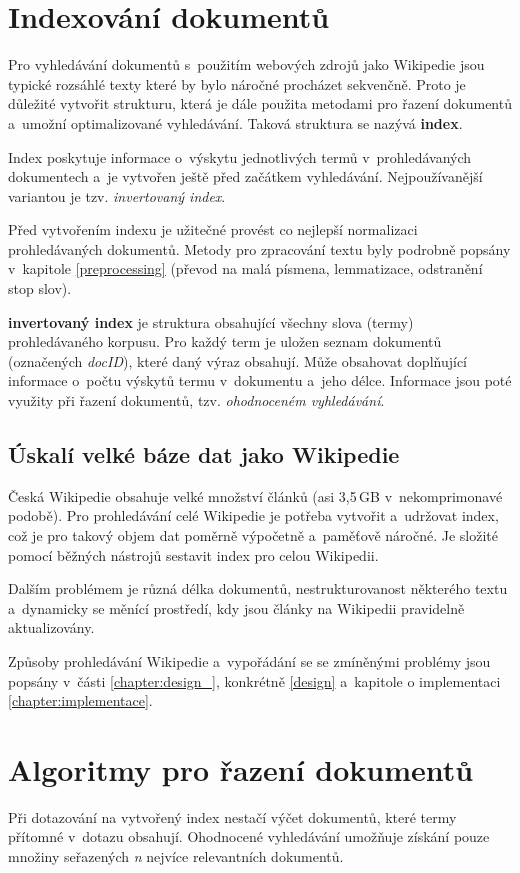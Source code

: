 \section{Indexování dokumentů}
Pro vyhledávání dokumentů s~použitím webových zdrojů jako Wikipedie jsou typické rozsáhlé texty které by bylo náročné procházet sekvenčně. Proto je důležité vytvořit strukturu, která je dále použita metodami pro řazení dokumentů a~umožní optimalizované vyhledávání. Taková struktura se nazývá \textbf{index}.\par
Index poskytuje informace o~výskytu jednotlivých termů v~prohledávaných dokumentech a~je vytvořen ještě před začátkem vyhledávání. Nejpoužívanější variantou je tzv. \emph{invertovaný index}.\par
Před vytvořením indexu je užitečné provést co nejlepší normalizaci prohledávaných dokumentů. Metody pro zpracování textu byly podrobně popsány v~kapitole \ref{preprocessing} (převod na malá písmena, lemmatizace, odstranění stop slov).\par
\textbf{invertovaný index} je struktura obsahující všechny slova (termy) prohledávaného korpusu. Pro každý term je uložen seznam dokumentů (označených \emph{docID}), které daný výraz obsahují. Může obsahovat doplňující informace o~počtu výskytů termu v~dokumentu a~jeho délce. Informace jsou poté využity při řazení dokumentů, tzv. \emph{ohodnoceném vyhledávání}.

\subsection{Úskalí velké báze dat jako Wikipedie}
Česká Wikipedie obsahuje velké množství článků (asi 3,5\,GB v~nekomprimonavé podobě). Pro prohledávání celé Wikipedie je potřeba vytvořit a~udržovat index, což je pro takový objem dat poměrně výpočetně a~paměťově náročné. Je složité pomocí běžných nástrojů sestavit index pro celou Wikipedii.\par
Dalším problémem je různá délka dokumentů, nestrukturovanost některého textu a~dynamicky se měnící prostředí, kdy jsou články na Wikipedii pravidelně aktualizovány.\par\enlargethispage{\baselineskip}
Způsoby prohledávání Wikipedie a~vypořádání se se zmíněnými problémy jsou popsány v~části \ref{chapter:design_}, konkrétně \ref{design} a~kapitole o implementaci \ref{chapter:implementace}.

\section{Algoritmy pro řazení dokumentů}
Při dotazování na vytvořený index nestačí výčet dokumentů, které termy přítomné v~dotazu obsahují. Ohodnocené vyhledávání umožňuje získání pouze množiny seřazených \emph{n} nejvíce relevantních dokumentů.\par

